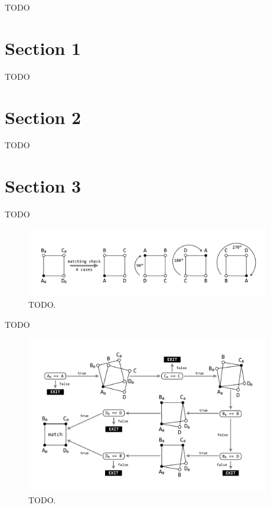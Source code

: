 \documentclass[
11pt,%
tightenlines,%
twoside,%
onecolumn,%
nofloats,%
nobibnotes,%
nofootinbib,%
superscriptaddress,%
noshowpacs,%
centertags]%
{revtex4}
\begin{document}
TODO

\section{Section 1}

TODO

\section{Section 2}

TODO

\section{Section 3}

TODO

\begin{figure}[h]
\setcaptionmargin{5mm}
\onelinecaptionstrue
\includegraphics[width=0.95\textwidth]{pics/match.pdf}
\caption{TODO.}
\label{fig:match}
\end{figure}

TODO

\begin{figure}[h]
\setcaptionmargin{5mm}
\onelinecaptionstrue
\includegraphics[width=0.95\textwidth]{pics/match2.pdf}
\caption{TODO.}
\label{fig:match2}
\end{figure}
\end{document}
